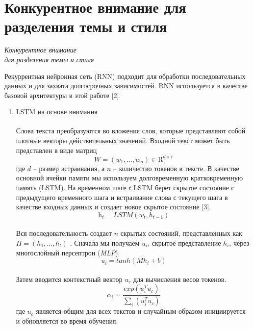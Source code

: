 \section{Конкурентное внимание для разделения темы и стиля}
\begin{center}
\emph{Конкурентное внимание}\\
\emph{для разделения темы и стиля}
\end{center}
\par Рекуррентная нейронная сеть (RNN) 
подходит для обработки последовательных 
данных и для захвата долгосрочных зависимостей. RNN используется в качестве базовой архитектуры в этой работе [2].
\begin{enumerate}[label={\arabic*)}, left=10pt]
\item LSTM на основе внимания
\paragraph*{} Слова текста преобразуются во вложения слов, которые представляют собой 
плотные векторы действительных значений. Входной текст может быть представлен в виде матриц
\[
\mathit{W} = (w_1, \ldots, w_n) \in \mathds{\mathrm{R}}^{d \times r}
\]
где $d$ – размер встраивания, а $n$ – количество токенов в тексте. В качестве основной 
ячейки памяти мы используем долговременную кратковременную память (LSTM). 
На временном шаге $t$ LSTM берет скрытое 
состояние с предыдущего временного шага 
и встраивание слова с текущего шага в качестве входных данных и создает новое скрытое состояние [3].
\begin{equation}
    \textit{h}_t = \textit{LSTM}(w_t, h_{t-1})
\end{equation}
\paragraph*{} Вся последовательность создает $n$ скрытых состояний, представленных как $\mathit{H} = (h_1, \ldots, h_t)$ . Сначала мы получаем $u_i$, скрытое представление $h_i$, через многослойный персептрон (\textit{MLP}).
\begin{equation}
    \textit{u}_i = tanh (Mh_i+b)
\end{equation}
\paragraph*{}Затем вводится контекстный вектор $u_c$
для вычисления весов токенов.
\begin{equation}
    \alpha_i = \frac{exp(u^T_iu_c)}{\sum_i(u^T_iu_c)}
\end{equation}
где $u_c$ является общим для всех текстов 
и случайным образом инициируется и обновляется во время обучения.

\end{enumerate}
